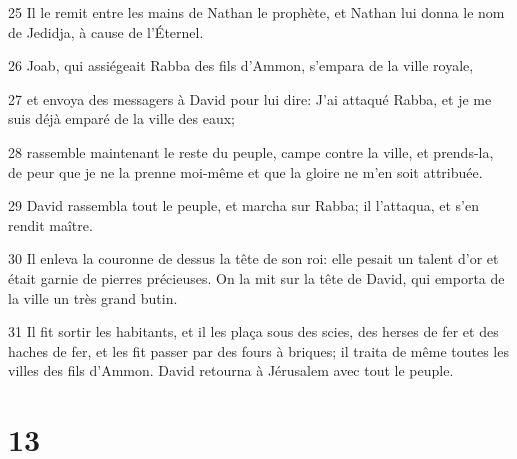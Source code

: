 \par 25 Il le remit entre les mains de Nathan le prophète, et Nathan lui donna le nom de Jedidja, à cause de l'Éternel.
\par 26 Joab, qui assiégeait Rabba des fils d'Ammon, s'empara de la ville royale,
\par 27 et envoya des messagers à David pour lui dire: J'ai attaqué Rabba, et je me suis déjà emparé de la ville des eaux;
\par 28 rassemble maintenant le reste du peuple, campe contre la ville, et prends-la, de peur que je ne la prenne moi-même et que la gloire ne m'en soit attribuée.
\par 29 David rassembla tout le peuple, et marcha sur Rabba; il l'attaqua, et s'en rendit maître.
\par 30 Il enleva la couronne de dessus la tête de son roi: elle pesait un talent d'or et était garnie de pierres précieuses. On la mit sur la tête de David, qui emporta de la ville un très grand butin.
\par 31 Il fit sortir les habitants, et il les plaça sous des scies, des herses de fer et des haches de fer, et les fit passer par des fours à briques; il traita de même toutes les villes des fils d'Ammon. David retourna à Jérusalem avec tout le peuple.

\chapter{13}

